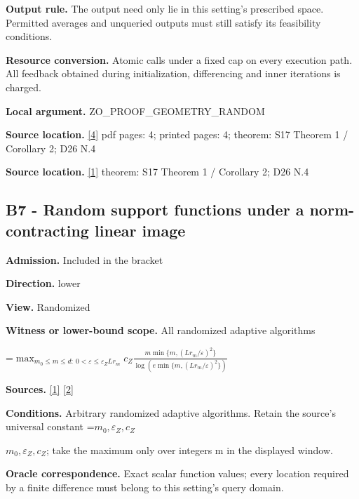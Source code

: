 \documentclass[10pt,a4paper]{article}
\newcommand{\AtlasMath}[1]{\par\begingroup\centering\setbox0=\hbox{$\displaystyle #1$}\ifdim\wd0>1.4\linewidth\typeout{ATLAS WIDE FORMULA: \the\wd0}\fi\ifdim\wd0>\linewidth\resizebox{\linewidth}{!}{\box0}\else\box0\fi\par\endgroup}
\newcommand{\AtlasInlineMath}[1]{\begingroup\setbox0=\hbox{$#1$}\ifdim\wd0>.4\linewidth\endgroup\AtlasMath{#1}\else\endgroup$#1$\fi}
\begin{document}
\textbf{Output rule.} The output need only lie in this setting's prescribed space. Permitted averages and unqueried outputs must still satisfy its feasibility conditions.



\textbf{Resource conversion.} Atomic calls under a fixed cap on every execution path. All feedback obtained during initialization, differencing and inner iterations is charged.



\textbf{Local argument.} ZO\_PROOF\_GEOMETRY\_RANDOM



\textbf{Source location.} \href{https://jmlr.org/papers/volume18/16-632/16-632.pdf}{[4]} pdf pages: 4; printed pages: 4; theorem: S17 Theorem 1 / Corollary 2; D26 N.4



\textbf{Source location.} \href{https://arxiv.org/html/2610.00345v1}{[1]} theorem: S17 Theorem 1 / Corollary 2; D26 N.4



\subsection{B7 - Random support functions under a norm-contracting linear image}


\textbf{Admission.} Included in the bracket



\textbf{Direction.} lower



\textbf{View.} Randomized



\textbf{Witness or lower-bound scope.} All randomized adaptive algorithms



\AtlasMath{\max_{m_0\le m\le d:\ 0<\varepsilon\le\varepsilon_Z Lr_m}c_Z\frac{m\min\{m,(Lr_m/\varepsilon)^2\}}{\log(e\min\{m,(Lr_m/\varepsilon)^2\})}}


\textbf{Sources.} \href{https://arxiv.org/html/2610.00345v1}{[1]} \href{https://arxiv.org/html/2607.16558v2}{[2]}



\textbf{Conditions.} Arbitrary randomized adaptive algorithms. Retain the source's universal constant \AtlasInlineMath{m_0,\varepsilon_Z,c_Z}; take the maximum only over integers m in the displayed window.



\textbf{Oracle correspondence.} Exact scalar function values; every location required by a finite difference must belong to this setting's query domain.
\end{document}
